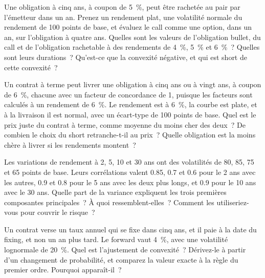 \begin{question}\label{iq:iv2:rates-and-fx:38}
Une obligation à cinq ans, à coupon de 5~\%, peut être rachetée au pair par l'émetteur dans un an. Prenez un rendement plat, une volatilité normale du rendement de 100 points de base, et évaluez le call comme une option, dans un an, sur l'obligation à quatre ans. Quelles sont les valeurs de l'obligation bullet, du call et de l'obligation rachetable à des rendements de 4~\%, 5~\% et 6~\%~? Quelles sont leurs durations~? Qu'est-ce que la convexité négative, et qui est short de cette convexité~?
\end{question}

\begin{question}\label{iq:iv2:rates-and-fx:39}
Un contrat à terme peut livrer une obligation à cinq ans ou à vingt ans, à coupon de 6~\%, chacune avec un facteur de concordance de 1, puisque les facteurs sont calculés à un rendement de 6~\%. Le rendement est à 6~\%, la courbe est plate, et à la livraison il est normal, avec un écart-type de 100 points de base. Quel est le prix juste du contrat à terme, comme moyenne du moins cher des deux~? De combien le choix du short retranche-t-il au prix~? Quelle obligation est la moins chère à livrer si les rendements montent~?
\end{question}

\begin{question}\label{iq:iv2:rates-and-fx:40}
Les variations de rendement à 2, 5, 10 et 30 ans ont des volatilités de 80, 85, 75 et 65 points de base. Leurs corrélations valent 0.85, 0.7 et 0.6 pour le 2 ans avec les autres, 0.9 et 0.8 pour le 5 ans avec les deux plus longs, et 0.9 pour le 10 ans avec le 30 ans. Quelle part de la variance expliquent les trois premières composantes principales~? À quoi ressemblent-elles~? Comment les utiliseriez-vous pour couvrir le risque~?
\end{question}

\begin{question}\label{iq:iv2:rates-and-fx:41}
Un contrat verse un taux annuel qui se fixe dans cinq ans, et il paie à la date du fixing, et non un an plus tard. Le forward vaut 4~\%, avec une volatilité lognormale de 20~\%. Quel est l'ajustement de convexité~? Dérivez-le à partir d'un changement de probabilité, et comparez la valeur exacte à la règle du premier ordre. Pourquoi apparaît-il~?
\end{question}

